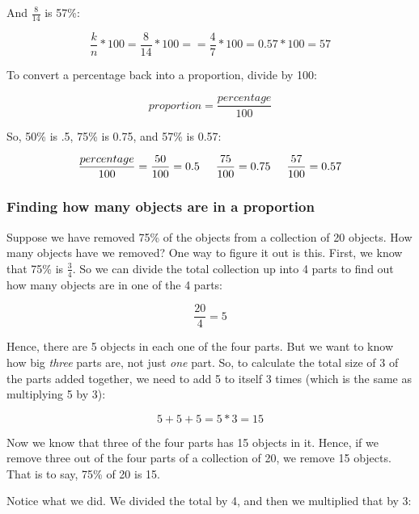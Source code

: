 \documentclass[../../../main.tex]{subfiles}
\begin{document}
\noindent
And $\frac{8}{14}$ is 57\%:

\begin{equation*}
  \frac{k}{n} * 100 = \frac{8}{14} * 100 =  = \frac{4}{7} * 100 = 0.57 * 100 = 57
\end{equation*}

\noindent
To convert a percentage back into a proportion, divide by 100: 

\begin{equation*}
  proportion = \frac{percentage}{100}
\end{equation*}

\noindent
So, 50\% is .5, 75\% is 0.75, and 57\% is 0.57:

\begin{equation*}
  \frac{percentage}{100} = \frac{50}{100} = 0.5 \hskip 0.5cm 
  \frac{75}{100} = 0.75 \hskip 0.5cm
  \frac{57}{100} = 0.57
\end{equation*}



\subsubsection{Finding how many objects are in a proportion}

Suppose we have removed 75\% of the objects from a collection of 20 objects. How many objects have we removed? One way to figure it out is this. First, we know that 75\% is $\frac{3}{4}$. So we can divide the total collection up into 4 parts to find out how many objects are in one of the 4 parts:

\begin{equation*}
  \frac{20}{4} = 5
\end{equation*}

\noindent
Hence, there are 5 objects in each one of the four parts. But we want to know how big \emph{three} parts are, not just \emph{one} part. So, to calculate the total size of 3 of the parts added together, we need to add 5 to itself 3 times (which is the same as multiplying 5 by 3):

\begin{equation*}
  5 + 5 + 5 = 5 * 3 = 15
\end{equation*}

\noindent
Now we know that three of the four parts has 15 objects in it. Hence, if we remove three out of the four parts of a collection of 20, we remove 15 objects. That is to say, 75\% of 20 is 15.

Notice what we did. We divided the total by 4, and then we multiplied that by 3:
\end{document}
